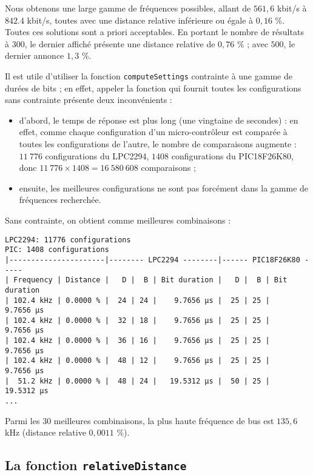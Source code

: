 Nous obtenons une large gamme de fréquences possibles, allant de $561,6$ kbit/s à $842.4$ kbit/s, toutes avec une distance relative inférieure ou égale à $0,16$ \%. Toutes ces solutions sont a priori acceptables. En portant le nombre de résultats à $300$, le dernier affiché présente une distance relative de $0,76$ \% ; avec $500$, le dernier annonce $1,3$ \%.


Il est utile d'utiliser la fonction \texttt{computeSettings} contrainte à une gamme de durées de bits ; en effet, appeler la fonction qui fournit toutes les configurations sans contrainte  présente deux inconvénients :
\begin{itemize}
\item d'abord, le temps de réponse est plus long (une vingtaine de secondes) : en effet, comme chaque configuration d'un micro-contrôleur est comparée à toutes les configurations de l'autre, le nombre de comparaisons augmente : $11~776$ configurations du LPC2294, $1408$ configurations du PIC18F26K80, donc $11~776\times1408=16~580~608$ comparaisons ;
\item ensuite, les meilleures configurations ne sont pas forcément dans la gamme de fréquences recherchée.
\end{itemize}

Sans contrainte, on obtient comme meilleures combinaisons :

{\footnotesize\singlespacing
\begin{verbatim}
LPC2294: 11776 configurations
PIC: 1408 configurations
|----------------------|-------- LPC2294 --------|------ PIC18F26K80 -----
| Frequency | Distance |   D |  B | Bit duration |   D |  B | Bit duration
| 102.4 kHz | 0.0000 % |  24 | 24 |    9.7656 µs |  25 | 25 |    9.7656 µs 
| 102.4 kHz | 0.0000 % |  32 | 18 |    9.7656 µs |  25 | 25 |    9.7656 µs 
| 102.4 kHz | 0.0000 % |  36 | 16 |    9.7656 µs |  25 | 25 |    9.7656 µs 
| 102.4 kHz | 0.0000 % |  48 | 12 |    9.7656 µs |  25 | 25 |    9.7656 µs 
|  51.2 kHz | 0.0000 % |  48 | 24 |   19.5312 µs |  50 | 25 |   19.5312 µs 
...
\end{verbatim}
}

Parmi les $30$ meilleures combinaisons, la plus haute fréquence de bus est $135,6$ kHz (distance relative $0,0011$ \%).


\subsection{La fonction \texttt{relativeDistance}}

